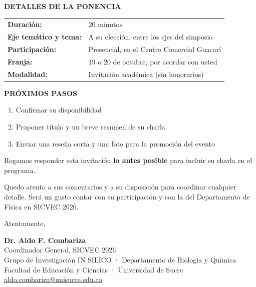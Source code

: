 \documentclass[11pt,a4paper]{article}
\begin{document}
\vspace{0.1cm}

\noindent
\textbf{DETALLES DE LA PONENCIA}

\begin{tabular}{ll}
\textbf{Duración:} & 20 minutos \\
\textbf{Eje temático y tema:} & A su elección, entre los ejes del simposio \\
\textbf{Participación:} & Presencial, en el Centro Comercial Guacarí \\
\textbf{Franja:} & 19 o 20 de octubre, por acordar con usted \\
\textbf{Modalidad:} & Invitación académica (sin honorarios) \\
\end{tabular}

\vspace{0.1cm}

\noindent
\textbf{PRÓXIMOS PASOS}

\begin{enumerate}\setlength{\itemsep}{0pt}
  \item Confirmar su disponibilidad
  \item Proponer título y un breve resumen de su charla
  \item Enviar una reseña corta y una foto para la promoción del evento
\end{enumerate}

Rogamos responder esta invitación \textbf{lo antes posible} para incluir su charla en el programa.

\vspace{0.1cm}

Quedo atento a sus comentarios y a su disposición para coordinar cualquier detalle. Será un gusto contar con su participación y con la del Departamento de Física en SICVEC 2026.

\vspace{0.15cm}

Atentamente,

\vspace{0.15cm}

\textbf{Dr. Aldo F. Combariza}\\
Coordinador General, SICVEC 2026\\
Grupo de Investigación IN SILICO · Departamento de Biología y Química\\
Facultad de Educación y Ciencias · Universidad de Sucre\\
\href{mailto:aldo.combariza@unisucre.edu.co}{aldo.combariza@unisucre.edu.co}
\end{document}
